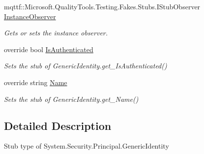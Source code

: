 \begin{DoxyCompactItemize}
mqttf\-::\-Microsoft.\-Quality\-Tools.\-Testing.\-Fakes.\-Stubs.\-I\-Stub\-Observer \hyperlink{class_system_1_1_security_1_1_principal_1_1_fakes_1_1_stub_generic_identity_a7b144995e36a4b344bdf80cd566a4c0b}{Instance\-Observer}
\begin{DoxyCompactList}\small\item\em Gets or sets the instance observer.\end{DoxyCompactList}\item 
override bool \hyperlink{class_system_1_1_security_1_1_principal_1_1_fakes_1_1_stub_generic_identity_a2c5be58f3492ade7bbc7e724e2cb74a6}{Is\-Authenticated}
\begin{DoxyCompactList}\small\item\em Sets the stub of Generic\-Identity.\-get\-\_\-\-Is\-Authenticated()\end{DoxyCompactList}\item 
override string \hyperlink{class_system_1_1_security_1_1_principal_1_1_fakes_1_1_stub_generic_identity_a57006aacd0b428fd17ac9e899bff18ce}{Name}
\begin{DoxyCompactList}\small\item\em Sets the stub of Generic\-Identity.\-get\-\_\-\-Name()\end{DoxyCompactList}\end{DoxyCompactItemize}


\subsection{Detailed Description}
Stub type of System.\-Security.\-Principal.\-Generic\-Identity



